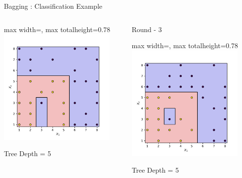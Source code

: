 \documentclass[8pt]{beamer}
\newcommand{\fitpic}[1]{\begin{adjustbox}{max width=\linewidth, max totalheight=0.78\textheight}#1\end{adjustbox}}
\begin{document}
\begin{frame}{Bagging : Classification Example}
\begin{columns}
\begin{column}{0.3\textwidth}
      \fitpic{\includegraphics[width = 0.9\textwidth]{../assets/ensemble/figures/decision-boundary-1}}
      Tree Depth = 5

    \end{column}
    \pause  \begin{column}{0.3\textwidth}
      \centering
      Round - 3\\

      \fitpic{\includegraphics[width = 0.9\textwidth]{../assets/ensemble/figures/decision-boundary-2}}
      Tree Depth = 5


\end{column}
\end{columns}
\end{frame}
\end{document}
